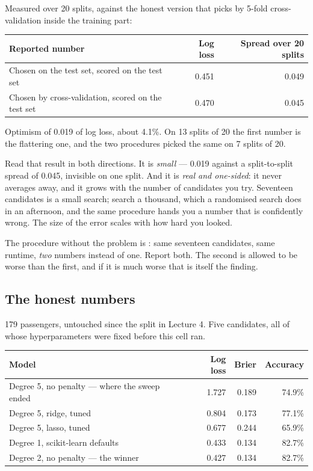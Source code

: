 \documentclass[11pt,a4paper]{article}
\begin{document}
Measured over 20 splits, against the honest version that picks  by
5-fold cross-validation inside the training part:

\begin{center}
\small
\begin{tabular}{lrr}
\toprule
\textbf{Reported number} & \textbf{Log loss} & \textbf{Spread over 20 splits} \\
\midrule
Chosen on the test set, scored on the test set & 0.451 & 0.049 \\
Chosen by cross-validation, scored on the test set & 0.470 & 0.045 \\
\bottomrule
\end{tabular}
\end{center}

Optimism of 0.019 of log loss, about 4.1\%. On 13 splits of 20 the first number
is the flattering one, and the two procedures picked the same  on 7
splits of 20.

Read that result in both directions. It is \emph{small} --- 0.019 against a
split-to-split spread of 0.045, invisible on one split. And it is \emph{real
and one-sided}: it never averages away, and it grows with the number of
candidates you try. Seventeen candidates is a small search; search a thousand,
which a randomised search does in an afternoon, and the same procedure hands
you a number that is confidently wrong. The size of the error scales with how
hard you looked.

The procedure without the problem is : same seventeen
candidates, same runtime, \emph{two} numbers instead of one. Report both. The
second is allowed to be worse than the first, and if it is much worse that is
itself the finding.

\subsection{The honest numbers}

179 passengers, untouched since the split in Lecture 4. Five candidates, all of
whose hyperparameters were fixed before this cell ran.

\begin{center}
\small
\begin{tabular}{lrrr}
\toprule
\textbf{Model} & \textbf{Log loss} & \textbf{Brier} & \textbf{Accuracy} \\
\midrule
Degree 5, no penalty --- where the sweep ended & 1.727 & 0.189 & 74.9\% \\
Degree 5, ridge, tuned    & 0.804 & 0.173 & 77.1\% \\
Degree 5, lasso, tuned    & 0.677 & 0.244 & 65.9\% \\
Degree 1, scikit-learn defaults & 0.433 & 0.134 & 82.7\% \\
Degree 2, no penalty --- the winner & 0.427 & 0.134 & 82.7\% \\
\bottomrule
\end{tabular}
\end{center}
\end{document}
